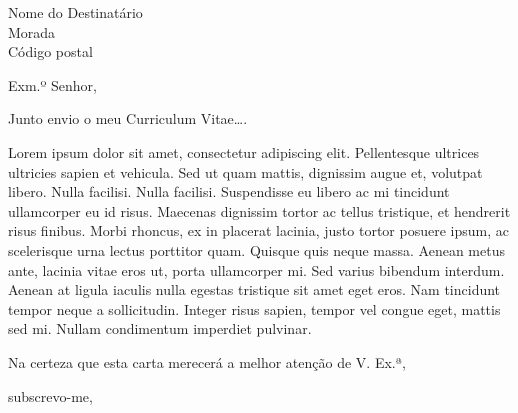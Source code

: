 \documentclass[a4paper,12pt]{letter-pt}
\date{\today}
\begin{document}
\begin{letter}{
    Nome do Destinatário\\
    Morada\\
    Código postal}
\opening{Exm.º Senhor,}

Junto envio o meu Curriculum Vitae\ldots. 

Lorem ipsum dolor sit amet, consectetur adipiscing elit. Pellentesque
ultrices ultricies sapien et vehicula. Sed ut quam mattis, dignissim
augue et, volutpat libero. Nulla facilisi. Nulla facilisi.
Suspendisse eu libero ac mi tincidunt ullamcorper eu id
risus. Maecenas dignissim tortor ac tellus tristique, et hendrerit
risus finibus. Morbi rhoncus, ex in placerat lacinia, justo tortor
posuere ipsum, ac scelerisque urna lectus porttitor quam. Quisque quis
neque massa. Aenean metus ante, lacinia vitae eros ut, porta
ullamcorper mi. Sed varius bibendum interdum.  Aenean at ligula
iaculis nulla egestas tristique sit amet eget eros. Nam tincidunt
tempor neque a sollicitudin. Integer risus sapien, tempor vel congue
eget, mattis sed mi. Nullam condimentum imperdiet pulvinar.

Na certeza que esta carta merecerá a melhor atenção de V. Ex.ª, 

\closing{subscrevo-me,}
\end{letter}
\end{document}
